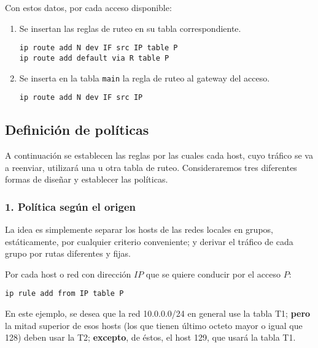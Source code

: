 Con estos datos, por cada acceso disponible:
\begin{enumerate}
	\item Se insertan las reglas de ruteo en su tabla correspondiente. 
\begin{lstlisting}
ip route add N dev IF src IP table P
ip route add default via R table P
\end{lstlisting}
	\item Se inserta en la tabla \texttt{main} la regla de ruteo al gateway del acceso.
	\begin{lstlisting}
ip route add N dev IF src IP
\end{lstlisting}
\end{enumerate} 

\subsection{Definición de políticas}
A continuación se establecen las reglas por las cuales cada host, cuyo tráfico se va a reenviar, utilizará una u otra tabla de ruteo. Consideraremos tres diferentes formas de diseñar y establecer las políticas. 

\subsubsection{1. Política según el origen}
La idea es simplemente separar los hosts de las redes locales en grupos, estáticamente, por cualquier criterio conveniente; y derivar el tráfico de cada grupo por rutas diferentes y fijas. 

Por cada host o red con dirección $IP$ que se quiere conducir por el acceso $P$:
\begin{lstlisting}
ip rule add from IP table P 
\end{lstlisting}


En este ejemplo, se desea que la red 10.0.0.0/24 en general use la tabla T1; \textbf{pero} la mitad superior de esos hosts (los que tienen último octeto mayor o igual que 128) deben usar la T2; \textbf{excepto}, de éstos, el host 129, que usará la tabla T1. 

